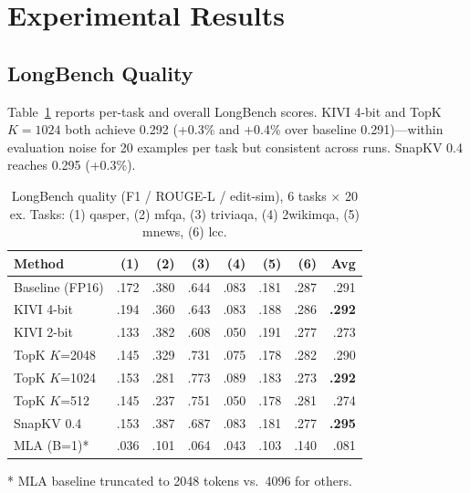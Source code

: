 \documentclass[conference]{IEEEtran}
\begin{document}
\section{Experimental Results}

\subsection{LongBench Quality}

Table~\ref{tab:quality} reports per-task and overall LongBench scores.
KIVI 4-bit and TopK $K\!=\!1024$ both achieve 0.292 (+0.3\% and +0.4\%
over baseline 0.291)---within evaluation noise for 20 examples per
task but consistent across runs.  SnapKV 0.4 reaches 0.295 (+0.3\%).

\begin{table}[!t]
\centering
\caption{LongBench quality (F1 / ROUGE-L / edit-sim), 6 tasks $\times$ 20 ex.
Tasks: (1) qasper, (2) mfqa, (3) triviaqa, (4) 2wikimqa,
(5) mnews, (6) lcc.}
\label{tab:quality}
\setlength{\tabcolsep}{3.5pt}
\begin{tabular}{@{}lrrrrrrr@{}}
\toprule
\textbf{Method} & \textbf{(1)} & \textbf{(2)} & \textbf{(3)} & \textbf{(4)} & \textbf{(5)} & \textbf{(6)} & \textbf{Avg} \\
\midrule
Baseline (FP16)       & .172 & .380 & .644 & .083 & .181 & .287 & .291 \\
KIVI 4-bit            & .194 & .360 & .643 & .083 & .188 & .286 & \textbf{.292} \\
KIVI 2-bit            & .133 & .382 & .608 & .050 & .191 & .277 & .273 \\
TopK $K$=2048         & .145 & .329 & .731 & .075 & .178 & .282 & .290 \\
TopK $K$=1024         & .153 & .281 & .773 & .089 & .183 & .273 & \textbf{.292} \\
TopK $K$=512          & .145 & .237 & .751 & .050 & .178 & .281 & .274 \\
SnapKV 0.4            & .153 & .387 & .687 & .083 & .181 & .277 & \textbf{.295} \\
MLA (B=1)*            & .036 & .101 & .064 & .043 & .103 & .140 & .081 \\
\bottomrule
\end{tabular}
\vspace{1pt}
\footnotesize{* MLA baseline truncated to 2048 tokens vs.\ 4096 for others.}
\end{table}
\end{document}
